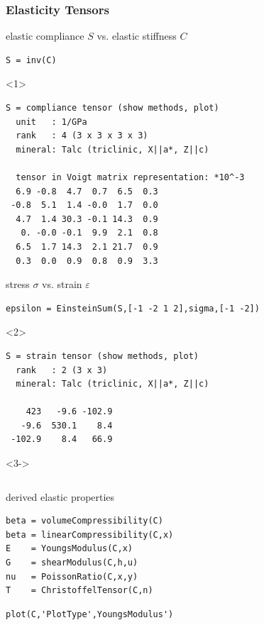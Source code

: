 \begin{frame}[fragile]
  \frametitle{Elasticity Tensors}

elastic compliance $S$ vs. elastic stiffness $C$
  \begin{lstlisting}
S = inv(C)
  \end{lstlisting}

  \begin{onlyenv}<1>
\begin{lstlisting}[style=output]
S = compliance tensor (show methods, plot)
  unit   : 1/GPa
  rank   : 4 (3 x 3 x 3 x 3)
  mineral: Talc (triclinic, X||a*, Z||c)

  tensor in Voigt matrix representation: *10^-3
  6.9 -0.8  4.7  0.7  6.5  0.3
 -0.8  5.1  1.4 -0.0  1.7  0.0
  4.7  1.4 30.3 -0.1 14.3  0.9
   0. -0.0 -0.1  9.9  2.1  0.8
  6.5  1.7 14.3  2.1 21.7  0.9
  0.3  0.0  0.9  0.8  0.9  3.3
\end{lstlisting}
\end{onlyenv}

\pause
\medskip

stress $\sigma$ vs. strain $\varepsilon$
  \begin{lstlisting}
epsilon = EinsteinSum(S,[-1 -2 1 2],sigma,[-1 -2])
  \end{lstlisting}

  \begin{onlyenv}<2>
\begin{lstlisting}[style=output]
S = strain tensor (show methods, plot)
  rank   : 2 (3 x 3)
  mineral: Talc (triclinic, X||a*, Z||c)

    423   -9.6 -102.9
   -9.6  530.1    8.4
 -102.9    8.4   66.9
\end{lstlisting}
\end{onlyenv}

\pause
\medskip

\begin{onlyenv}<3->

  \begin{columns}
    \begin{column}{7.7cm}

      derived elastic properties
\begin{lstlisting}
beta = volumeCompressibility(C)
beta = linearCompressibility(C,x)
E    = YoungsModulus(C,x)
G    = shearModulus(C,h,u)
nu   = PoissonRatio(C,x,y)
T    = ChristoffelTensor(C,n)
\end{lstlisting}


\begin{lstlisting}
plot(C,'PlotType',YoungsModulus')
\end{lstlisting}


\end{column}
\end{columns}
\end{onlyenv}
\end{frame}
